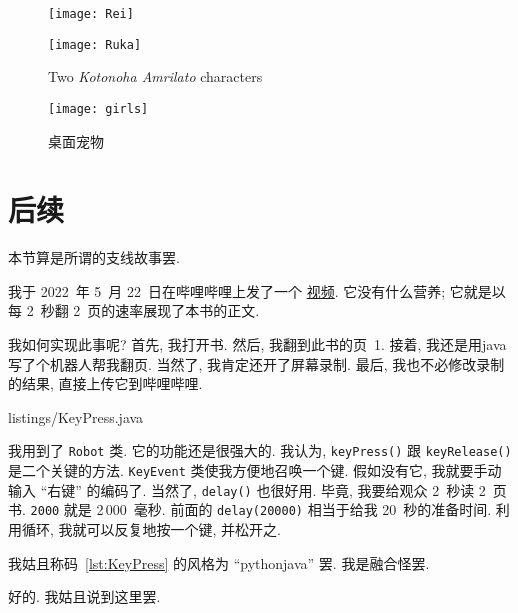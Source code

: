 \begin{figure}[h!]
    \centering
    \begin{minipage}{0.3\textwidth}
        \texttt{[image: Rei]}
    \end{minipage}
    \hspace{0.15\textwidth}
    \begin{minipage}{0.3\textwidth}
        \texttt{[image: Ruka]}
    \end{minipage}
    \caption{Two \textit{Kotonoha Amrilato} characters}
\end{figure}

\begin{figure}[h!]
    \centering
    \texttt{[image: girls]}
    \caption{桌面宠物}
    \label{fig:Girls}
\end{figure}

\section{后续}

\begin{remark*}
    本节算是所谓的支线故事罢.
\end{remark*}

我于 2022~年 5~月 22~日在哔哩哔哩上发了一个%
\href{https://www.bilibili.com/video/BV1JY4y157BX}{视频}.
它没有什么营养;
它就是以每 2~秒翻 2~页的速率展现了本书的正文.

我如何实现此事呢?
首先, 我打开书.
然后, 我翻到此书的页~1.
接着, 我还是用\gls{java}写了个机器人帮我翻页.
当然了, 我肯定还开了屏幕录制.
最后, 我也不必修改录制的结果, 直接上传它到哔哩哔哩.


{listings/KeyPress.java}

我用到了 \verb`Robot` 类.
它的功能还是很强大的.
我认为,
\verb`keyPress()` 跟 \verb`keyRelease()`
是二个关键的方法.
\verb`KeyEvent` 类使我方便地召唤一个键.
假如没有它,
我就要手动输入 ``右键'' 的编码了.
当然了, \verb`delay()` 也很好用.
毕竟, 我要给观众 2~秒读 2~页书.
\verb`2000` 就是 2\,000~毫秒.
前面的 \verb`delay(20000)` 相当于给我
20~秒的准备时间.
利用循环, 我就可以反复地按一个键, 并松开之.

我姑且称码~\ref{lst:KeyPress} 的风格为
``\gls{python}\gls{java}'' 罢.
我是融合怪罢.

好的.
我姑且说到这里罢.
